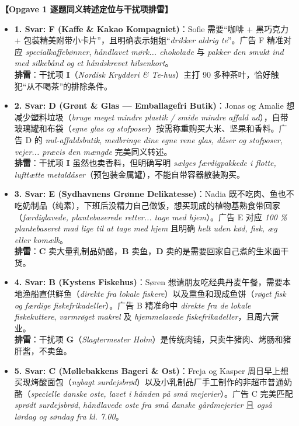 \begin{answerbox}
\textbf{\color{NCDNavy}【Opgave 1 逐题同义转述定位与干扰项排雷】}
\begin{itemize}
  \item \textbf{1. Svar: F (Kaffe \& Kakao Kompagniet)}：Sofie 需要“咖啡 + 黑巧克力 + 包装精美附带小卡片”，且明确表示姐姐“\textit{drikker aldrig te}”。广告 F 精准对应 \textit{specialkaffebønner}, \textit{håndlavet mørk... chokolade} 与 \textit{pakker den smukt ind med silkebånd og et håndskrevet hilsenkort}。\\
  \textbf{排雷}：干扰项 \textbf{I}（\textit{Nordisk Krydderi \& Te-hus}）主打 90 多种茶叶，恰好触犯“从不喝茶”的排除条件。
  \item \textbf{2. Svar: D (Grønt \& Glas --- Emballagefri Butik)}：Jonas og Amalie 想减少塑料垃圾（\textit{bruge meget mindre plastik / smide mindre affald ud}），自带玻璃罐和布袋（\textit{egne glas og stofposer}）按需称重购买大米、坚果和香料。广告 D 的 \textit{nul-affaldsbutik}, \textit{medbringe dine egne rene glas, dåser og stofposer}, \textit{vejer... præcis den mængde} 完美同义转述。\\
  \textbf{排雷}：干扰项 \textbf{I} 虽然也卖香料，但明确写明 \textit{sælges færdigpakkede i flotte, lufttætte metaldåser}（预包装金属罐），不能自带容器散装购买。
  \item \textbf{3. Svar: E (Sydhavnens Grønne Delikatesse)}：Nadia 既不吃肉、鱼也不吃奶制品（纯素），下班后没精力自己做饭，想买现成的植物基熟食带回家（\textit{færdiglavede, plantebaserede retter... tage med hjem}）。广告 E 对应 \textit{100 \% plantebaseret mad lige til at tage med hjem} 且明确 \textit{helt uden kød, fisk, æg eller komælk}。\\
  \textbf{排雷}：\textbf{C} 卖大量乳制品奶酪，\textbf{B} 卖鱼，\textbf{D} 卖的是需要回家自己煮的生米面干货。
  \item \textbf{4. Svar: B (Kystens Fiskehus)}：Søren 想请朋友吃经典丹麦午餐，需要本地渔船直供鲜鱼（\textit{direkte fra lokale fiskere}）以及熏鱼和现成鱼饼（\textit{røget fisk og færdige fiskefrikadeller}）。广告 B 精准命中 \textit{direkte fra de lokale fiskekuttere}, \textit{varmrøget makrel} 及 \textit{hjemmelavede fiskefrikadeller}，且周六营业。\\
  \textbf{排雷}：干扰项 \textbf{G}（\textit{Slagtermester Holm}）是传统肉铺，只卖牛猪肉、烤肠和猪肝酱，不卖鱼。
  \item \textbf{5. Svar: C (Møllebakkens Bageri \& Ost)}：Freja og Kasper 周日早上想买现烤酸面包（\textit{nybagt surdejsbrød}）以及小乳制品厂手工制作的非超市普通奶酪（\textit{specielle danske oste, lavet i hånden på små mejerier}）。广告 C 完美匹配 \textit{sprødt surdejsbrød}, \textit{håndlavede oste fra små danske gårdmejerier} 且 \textit{også lørdag og søndag fra kl. 7.00}。\\

\end{itemize}
\end{answerbox}
